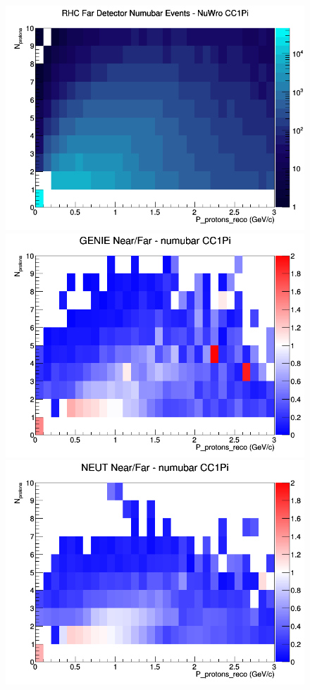 \begin{figure}[h]
\endminipage
{}
\includegraphics[width=\linewidth]{eff_N_P/FGT/protons/CC1Pi_RHC_FD_numubar_N_P_NuWro.png}
\endminipage
\newline
{}
\includegraphics[width=\linewidth]{eff_N_P/FGT/protons/ratios/CC1Pi_GENIE_numubar_NF_N_P.png}
\endminipage
{}
\includegraphics[width=\linewidth]{eff_N_P/FGT/protons/ratios/CC1Pi_NEUT_numubar_NF_N_P.png}

\end{figure}
